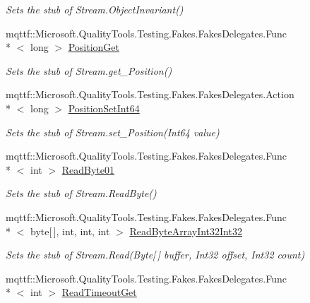 \begin{DoxyCompactItemize}
\begin{DoxyCompactList}\small\item\em Sets the stub of Stream.\-Object\-Invariant()\end{DoxyCompactList}\item 
mqttf\-::\-Microsoft.\-Quality\-Tools.\-Testing.\-Fakes.\-Fakes\-Delegates.\-Func\\*
$<$ long $>$ \hyperlink{class_system_1_1_i_o_1_1_fakes_1_1_stub_stream_ac33a1d247097596208168af68b401370}{Position\-Get}
\begin{DoxyCompactList}\small\item\em Sets the stub of Stream.\-get\-\_\-\-Position()\end{DoxyCompactList}\item 
mqttf\-::\-Microsoft.\-Quality\-Tools.\-Testing.\-Fakes.\-Fakes\-Delegates.\-Action\\*
$<$ long $>$ \hyperlink{class_system_1_1_i_o_1_1_fakes_1_1_stub_stream_a5156555f6083382e5af5b808ea90f41f}{Position\-Set\-Int64}
\begin{DoxyCompactList}\small\item\em Sets the stub of Stream.\-set\-\_\-\-Position(\-Int64 value)\end{DoxyCompactList}\item 
mqttf\-::\-Microsoft.\-Quality\-Tools.\-Testing.\-Fakes.\-Fakes\-Delegates.\-Func\\*
$<$ int $>$ \hyperlink{class_system_1_1_i_o_1_1_fakes_1_1_stub_stream_af0477adfadb164c170405d327b846f5e}{Read\-Byte01}
\begin{DoxyCompactList}\small\item\em Sets the stub of Stream.\-Read\-Byte()\end{DoxyCompactList}\item 
mqttf\-::\-Microsoft.\-Quality\-Tools.\-Testing.\-Fakes.\-Fakes\-Delegates.\-Func\\*
$<$ byte\mbox{[}$\,$\mbox{]}, int, int, int $>$ \hyperlink{class_system_1_1_i_o_1_1_fakes_1_1_stub_stream_aa2dcdc4a1ecece49ffbcf678287d6262}{Read\-Byte\-Array\-Int32\-Int32}
\begin{DoxyCompactList}\small\item\em Sets the stub of Stream.\-Read(\-Byte\mbox{[}$\,$\mbox{]} buffer, Int32 offset, Int32 count)\end{DoxyCompactList}\item 
mqttf\-::\-Microsoft.\-Quality\-Tools.\-Testing.\-Fakes.\-Fakes\-Delegates.\-Func\\*
$<$ int $>$ \hyperlink{class_system_1_1_i_o_1_1_fakes_1_1_stub_stream_ad45424578a2b787e8111e922e06af377}{Read\-Timeout\-Get}

\end{DoxyCompactItemize}
